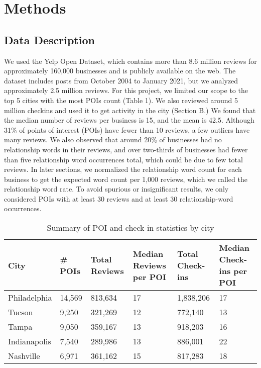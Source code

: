 \section{Methods}
\subsection{Data Description}
We used the Yelp Open Dataset, which contains more than 8.6 million reviews for approximately 160,000 businesses\cite{b4} and is publicly available on the web\cite{b5}. The dataset includes posts from October 2004 to January 2021, but we analyzed approximately 2.5 million reviews. For this project, we limited our scope to the top 5 cities with the most POIs count (Table 1). We also reviewed around 5 million checkins and used it to get activity in the city (Section B.)
We found that the median number of reviews per business is 15, and the mean is 42.5. Although 31\% of points of interest (POIs) have fewer than 10 reviews, a few outliers have many reviews. We also observed that around 20\% of businesses had no relationship words in their reviews, and over two-thirds of businesses had fewer than five relationship word occurrences total, which could be due to few total reviews. In later sections, we normalized the relationship word count for each business to get the expected word count per 1,000 reviews, which we called the relationship word rate. To avoid spurious or insignificant results, we only considered POIs with at least 30 reviews and at least 30 relationship-word occurrences.

\begin{table}[htbp]
  \renewcommand{\arraystretch}{1.2}
  \caption{Summary of POI and check-in statistics by city}
  \label{table:poi_stats}
  \centering
  \begin{tabular}{|p{1.3cm}|p{1cm}|p{1cm}|p{1cm}|p{1cm}|p{1cm}|}
    \hline
    \textbf{City} & \textbf{\# POIs} & \textbf{Total Reviews} & \textbf{Median Reviews per POI} & \textbf{Total Check-ins} & \textbf{Median Check-ins per POI} \\
    \hline
    Philadelphia & 14,569 & 813,634 & 17 & 1,838,206 & 17 \\
    \hline
    Tucson & 9,250 & 321,269 & 12 & 772,140 & 13 \\
    \hline
    Tampa & 9,050 & 359,167 & 13 & 918,203 & 16 \\
    \hline
    Indianapolis & 7,540 & 289,986 & 13 & 886,001 & 22 \\
    \hline
    Nashville & 6,971 & 361,162 & 15 & 817,283 & 18 \\
    \hline
  \end{tabular}
\end{table}

